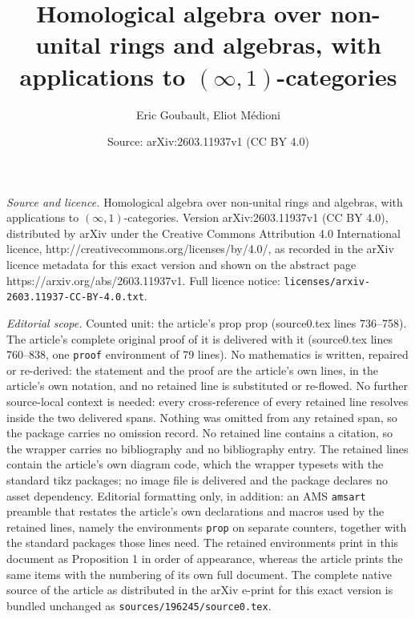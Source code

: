 \documentclass[10pt,a4paper]{amsart}
\title{Homological algebra over non-unital rings and algebras, with applications to $(\infty, 1)$-categories}
\author{Eric Goubault, Eliot M\'edioni}
\date{Source: arXiv:2603.11937v1 (CC BY 4.0)}
\begin{document}
\maketitle

\noindent\emph{Source and licence.} Homological algebra over non-unital rings and algebras, with applications to $(\infty, 1)$-categories. Version arXiv:2603.11937v1 (CC BY 4.0), distributed by arXiv under the Creative Commons Attribution 4.0 International licence, http://creativecommons.org/licenses/by/4.0/, as recorded in the arXiv licence metadata for this exact version and shown on the abstract page https://arxiv.org/abs/2603.11937v1. Full licence notice: \texttt{licenses/arxiv-2603.11937-CC-BY-4.0.txt}.\par\smallskip

\noindent\textit{Editorial scope.} Counted unit: the article's prop prop (source0.tex lines 736--758). The article's complete original proof of it is delivered with it (source0.tex lines 760--838, one \texttt{proof} environment of 79 lines). No mathematics is written, repaired or re-derived: the statement and the proof are the article's own lines, in the article's own notation, and no retained line is substituted or re-flowed.  No further source-local context is needed: every cross-reference of every retained line resolves inside the two delivered spans.  Nothing was omitted from any retained span, so the package carries no omission record.  No retained line contains a citation, so the wrapper carries no bibliography and no bibliography entry.  The retained lines contain the article's own diagram code, which the wrapper typesets with the standard tikz packages; no image file is delivered and the package declares no asset dependency.  Editorial formatting only, in addition: an AMS \texttt{amsart} preamble that restates the article's own declarations and macros used by the retained lines, namely the environments \texttt{prop} on separate counters, together with the standard packages those lines need.  The retained environments print in this document as Proposition 1 in order of appearance, whereas the article prints the same items with the numbering of its own full document.  The complete native source of the article as distributed in the arXiv e-print for this exact version is bundled unchanged as \texttt{sources/196245/source0.tex}.
\end{document}
